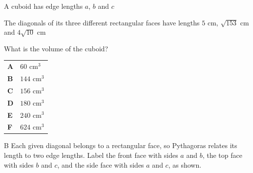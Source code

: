 \documentclass[11pt,a4paper]{article}
\begin{document}
\begin{enumerate}[label=\textbf{\arabic*.},leftmargin=*,itemsep=0pt,start=15]
\questionitem[Geometry]
A cuboid has edge lengths $a$, $b$ and $c$ 

The diagonals of its three different rectangular faces have lengths $5\text{ cm}$, $\sqrt{153}\text{ cm}$ and $4\sqrt{10}\text{ cm}$

What is the volume of the cuboid?

\par\vspace*{12pt}
\begin{tabularx}{\linewidth}{@{}>{\bfseries}l Y@{}}
A &
$60\text{ cm}^3$
\\[0.8em]
B &
$144\text{ cm}^3$
\\[0.8em]
C &
$156\text{ cm}^3$
\\[0.8em]
D &
$180\text{ cm}^3$
\\[0.8em]
E &
$240\text{ cm}^3$
\\[0.8em]
F &
$624\text{ cm}^3$
\\
\end{tabularx}

\begin{djsSolution}{B}
Each given diagonal belongs to a rectangular face, so Pythagoras relates its length to two edge lengths. Label the front face with sides $a$ and $b$, the top face with sides $b$ and $c$, and the side face with sides $a$ and $c$, as shown.

\begin{djsSolutionFigure}
\end{djsSolutionFigure}
\end{djsSolution}
\end{enumerate}
\end{document}
